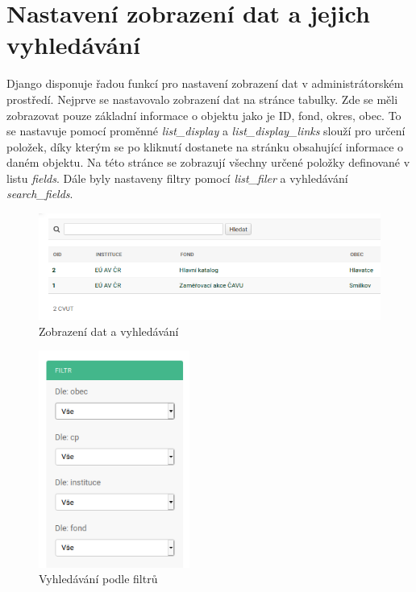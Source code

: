 \section{Nastavení zobrazení dat a jejich vyhledávání}

Django disponuje řadou funkcí pro nastavení zobrazení dat v administrátorském prostředí. Nejprve se nastavovalo zobrazení dat na stránce tabulky. Zde se měli zobrazovat pouze základní informace o objektu jako je ID, fond, okres, obec. To se nastavuje pomocí proměnné \emph{list\_display} a \emph{list\_display\_links} slouží pro určení položek, díky kterým se po kliknutí dostanete na stránku obsahující informace o daném objektu. Na této stránce se zobrazují všechny určené položky definované v listu \emph{fields}. Dále byly nastaveny filtry pomocí \emph{list\_filer} a vyhledávání \emph{search\_fields}. 

\begin{figure}[H] \centering
    \includegraphics[width=400pt]{./pictures/21-zobrazeni-dat.PNG}
    \caption[Zobrazení dat a vyhledávání]{Zobrazení dat a vyhledávání}
	\label{fig:Zobrazení dat a vyhledávání}              
\end{figure}

\begin{figure}[H] \centering
    \includegraphics[width=140pt]{./pictures/22-filtry.PNG}
    \caption[Vyhledávání podle filtrů]{Vyhledávání podle filtrů}
	\label{fig:Vyhledávání podle filtrů}              
\end{figure}

